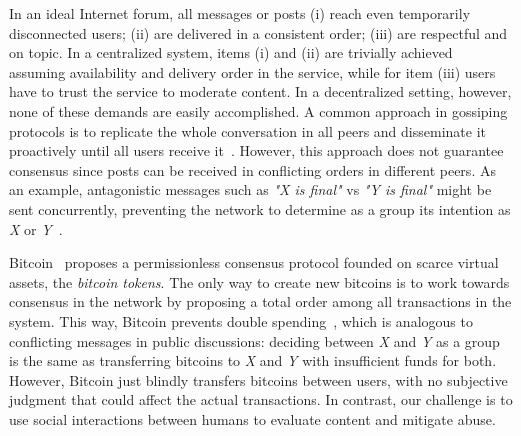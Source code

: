 \documentclass[10pt,journal,compsoc]{IEEEtran}
\begin{document}
In an ideal Internet forum, all messages or posts
(i)   reach even temporarily disconnected users;
(ii)  are delivered in a consistent order;
(iii) are respectful and on topic.
In a centralized system, items (i) and (ii) are trivially achieved assuming
availability and delivery order in the service, while for item (iii) users have
to trust the service to moderate content.
In a decentralized setting, however, none of these demands are easily
accomplished.
A common approach in gossiping protocols is to replicate the whole conversation
in all peers and disseminate it proactively until all users receive
it~\cite{p2p.survey}.
However, this approach does not guarantee consensus since posts can be received
in conflicting orders in different peers.
As an example, antagonistic messages such as \emph{"X is final"} vs
\emph{"Y is final"} might be sent concurrently, preventing the network to
determine as a group its intention as \emph{X} or \emph{Y}~\cite{p2p.intention}.

Bitcoin~\cite{p2p.bitcoin} proposes a permissionless consensus protocol founded
on scarce virtual assets, the \emph{bitcoin tokens}.
%
The only way to create new bitcoins is to work towards consensus in the network
by proposing a total order among all transactions in the system.
%
This way, Bitcoin prevents double spending~\cite{p2p.bitcoin}, which is
analogous to conflicting messages in public discussions:
    deciding between \emph{X} and \emph{Y} as a group is the same as
    transferring bitcoins to \emph{X} and \emph{Y} with insufficient funds for
    both.
%
However, Bitcoin just blindly transfers bitcoins between users, with no
subjective judgment that could affect the actual transactions.
In contrast, our challenge is to use social interactions between humans to
evaluate content and mitigate abuse.
\end{document}
